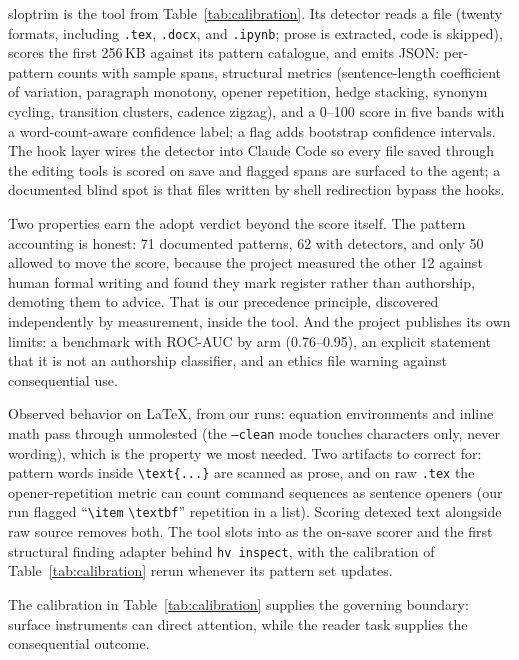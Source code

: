 sloptrim is the tool from Table~\ref{tab:calibration}. Its detector reads a
file (twenty formats, including \texttt{.tex}, \texttt{.docx}, and
\texttt{.ipynb}; prose is extracted, code is skipped), scores the first
256\,KB against its pattern catalogue, and emits JSON: per-pattern counts
with sample spans, structural metrics (sentence-length coefficient of
variation, paragraph monotony, opener repetition, hedge stacking, synonym
cycling, transition clusters, cadence zigzag), and a 0--100 score in five
bands with a word-count-aware confidence label; a flag adds bootstrap
confidence intervals. The hook layer wires the detector into Claude Code so
every file saved through the editing tools is scored on save and flagged
spans are surfaced to the agent; a documented blind spot is that files
written by shell redirection bypass the hooks.

Two properties earn the adopt verdict beyond the score itself. The pattern
accounting is honest: 71 documented patterns, 62 with detectors, and only 50
allowed to move the score, because the project measured the other 12 against
human formal writing and found they mark register rather than authorship,
demoting them to advice. That is our precedence principle, discovered
independently by measurement, inside the tool. And the project publishes its
own limits: a benchmark with ROC-AUC by arm (0.76--0.95), an explicit
statement that it is not an authorship classifier, and an ethics file
warning against consequential use.

Observed behavior on LaTeX, from our runs: equation environments and inline
math pass through unmolested (the \texttt{--clean} mode touches characters
only, never wording), which is the property we most needed. Two artifacts
to correct for: pattern words inside \verb|\text{...}| are scanned as
prose, and on raw \texttt{.tex} the opener-repetition metric can count
command sequences as sentence openers (our run flagged ``\verb|\item|
\verb|\textbf|'' repetition in a list). Scoring detexed text alongside raw
source removes both. The tool slots into \hv{} as the on-save scorer and
the first structural finding adapter behind \texttt{hv inspect}, with the calibration of
Table~\ref{tab:calibration} rerun whenever its pattern set updates.

The calibration in Table~\ref{tab:calibration} supplies the governing boundary:
surface instruments can direct attention, while the reader task supplies the
consequential outcome.

\hvFigurePackageFamilies

